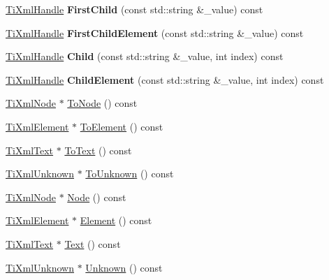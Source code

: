 \begin{DoxyCompactItemize}
\hyperlink{class_ti_xml_handle}{Ti\+Xml\+Handle} {\bfseries First\+Child} (const std\+::string \&\+\_\+value) const
\item 
\hypertarget{class_ti_xml_handle_ad048deff008dbb4b6887e9ac0d91f7df}{}\label{class_ti_xml_handle_ad048deff008dbb4b6887e9ac0d91f7df} 
\hyperlink{class_ti_xml_handle}{Ti\+Xml\+Handle} {\bfseries First\+Child\+Element} (const std\+::string \&\+\_\+value) const
\item 
\hypertarget{class_ti_xml_handle_abc163863954f3e3cf38d08c0773ce066}{}\label{class_ti_xml_handle_abc163863954f3e3cf38d08c0773ce066} 
\hyperlink{class_ti_xml_handle}{Ti\+Xml\+Handle} {\bfseries Child} (const std\+::string \&\+\_\+value, int index) const
\item 
\hypertarget{class_ti_xml_handle_afac0eed86787294829cca36c44626be2}{}\label{class_ti_xml_handle_afac0eed86787294829cca36c44626be2} 
\hyperlink{class_ti_xml_handle}{Ti\+Xml\+Handle} {\bfseries Child\+Element} (const std\+::string \&\+\_\+value, int index) const
\item 
\hyperlink{class_ti_xml_node}{Ti\+Xml\+Node} $\ast$ \hyperlink{class_ti_xml_handle_a0e436dea2dd869a859e3a4486023f0fa}{To\+Node} () const
\item 
\hyperlink{class_ti_xml_element}{Ti\+Xml\+Element} $\ast$ \hyperlink{class_ti_xml_handle_a0e3a5333550237d899b1df2b965611a1}{To\+Element} () const
\item 
\hyperlink{class_ti_xml_text}{Ti\+Xml\+Text} $\ast$ \hyperlink{class_ti_xml_handle_abde286bce1d5db0d20ec30e573278cdf}{To\+Text} () const
\item 
\hyperlink{class_ti_xml_unknown}{Ti\+Xml\+Unknown} $\ast$ \hyperlink{class_ti_xml_handle_a450ec91dac1ded02d72eb918d062ad31}{To\+Unknown} () const
\item 
\hyperlink{class_ti_xml_node}{Ti\+Xml\+Node} $\ast$ \hyperlink{class_ti_xml_handle_aec0e3ea58ff98a45cd13507a02e2ca1e}{Node} () const
\item 
\hyperlink{class_ti_xml_element}{Ti\+Xml\+Element} $\ast$ \hyperlink{class_ti_xml_handle_ae9b22d71bf5f69ee5fda28f5ad21f19c}{Element} () const
\item 
\hyperlink{class_ti_xml_text}{Ti\+Xml\+Text} $\ast$ \hyperlink{class_ti_xml_handle_ad3b502c72059421e4dfcc7bda3c392fe}{Text} () const
\item 
\hyperlink{class_ti_xml_unknown}{Ti\+Xml\+Unknown} $\ast$ \hyperlink{class_ti_xml_handle_a12b32f098c7daa5facbc04e9618262c5}{Unknown} () const
\end{DoxyCompactItemize}


